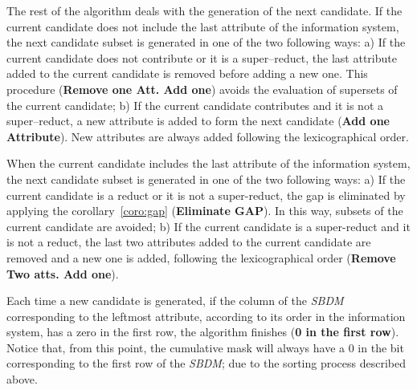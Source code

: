 \documentclass[authoryear,preprint,review,12pt]{elsarticle}
\begin{document}
	The rest of the algorithm deals with the generation of the next candidate. 
	If the current candidate does not include the last attribute of the information system, the next candidate subset is generated in one of the two following ways: a) If the current candidate does not contribute or it is a super--reduct, the last attribute added to the current candidate is removed before adding a new one. This procedure (\textbf{Remove one Att. Add one}) avoids the evaluation of supersets of the current candidate; b) If the current candidate contributes and it is not a super--reduct, a new attribute is added to form the next candidate (\textbf{Add one Attribute}). New attributes are always added following the lexicographical order. 
	
	When the current candidate includes the last attribute of the information system, the next candidate subset is generated in one of the two following ways: a) If the current candidate is a reduct or it is not a super-reduct, the gap is eliminated by applying the corollary~\ref{coro:gap} (\textbf{Eliminate GAP}). %
	In this way, subsets of the current candidate are avoided; b) If the current candidate is a super-reduct and it is not a reduct, the last two attributes added to the current candidate are removed and a new one is added, following the lexicographical order (\textbf{Remove Two atts. Add one}).
	
	Each time a new candidate is generated, if the column of the \textit{SBDM} corresponding to the leftmost attribute, according to its order in the information system, has a zero in the first row, the algorithm finishes (\textbf{0 in the first row}). Notice that, from this point, the cumulative mask will always have a 0 in the bit corresponding to the first row of the \textit{SBDM}; due to the sorting process described above.
	
\end{document}
